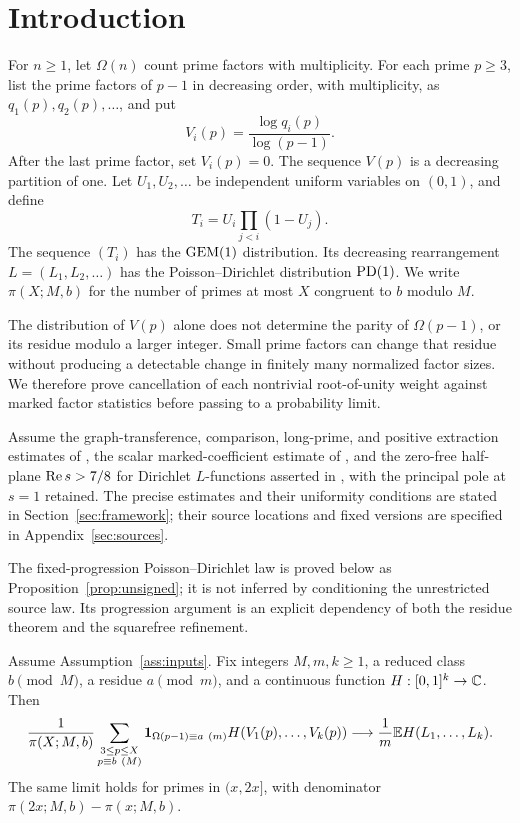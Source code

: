 \section{Introduction}\label{sec:statements}

For $n\geq1$, let $\Omega(n)$ count prime factors with multiplicity.
For each prime $p\geq3$, list the prime factors of $p-1$ in decreasing
order, with multiplicity, as $q_1(p),q_2(p),\ldots$, and put
\[
 V_i(p)=\frac{\log q_i(p)}{\log(p-1)}.
\]
After the last prime factor, set $V_i(p)=0$. The sequence $V(p)$ is a
decreasing partition of one. Let $U_1,U_2,\ldots$ be independent uniform
variables on $(0,1)$, and define
\[
 T_i=U_i\prod_{j<i}(1-U_j).
\]
The sequence $(T_i)$ has the $\operatorname{GEM}(1)$ distribution. Its decreasing
rearrangement $L=(L_1,L_2,\ldots)$ has the Poisson--Dirichlet distribution
$\operatorname{PD}(1)$. We write $\pi(X;M,b)$ for the number of primes at most $X$
congruent to $b$ modulo $M$.

The distribution of $V(p)$ alone does not determine the parity of
$\Omega(p-1)$, or its residue modulo a larger integer. Small prime factors
can change that residue without producing a detectable change in finitely
many normalized factor sizes. We therefore prove cancellation of each
nontrivial root-of-unity weight against marked factor statistics before
passing to a probability limit.

\begin{assumption}\label{ass:inputs}
Assume the graph-transference, comparison, long-prime, and positive
extraction estimates of \cite{D,S}, the scalar marked-coefficient
estimate of \cite{P}, and the zero-free half-plane $\operatorname{Re} s>7/8$ for
Dirichlet $L$-functions asserted in \cite{Z}, with the principal pole
at $s=1$ retained. The precise estimates and their uniformity conditions
are stated in Section~\ref{sec:framework}; their source locations and
fixed versions are specified in Appendix~\ref{sec:sources}.
\end{assumption}

The fixed-progression Poisson--Dirichlet law is proved below as
Proposition~\ref{prop:unsigned}; it is not inferred by conditioning the
unrestricted source law. Its progression argument is an explicit
dependency of both the residue theorem and the squarefree refinement.

\begin{theorem}\label{thm:main}
Assume Assumption~\ref{ass:inputs}. Fix integers $M,m,k\geq1$, a reduced
class $b\pmod M$, a residue $a\pmod m$, and a continuous function
$H:[0,1]^k\to\mathbb C$. Then
\begin{equation}\label{eq:main}
 \frac{1}{\pi(X;M,b)}
 \sum_{\substack{3\leq p\leq X\\p\equiv b\ (M)}}
 \mathbf 1_{\Omega(p-1)\equiv a\ (m)}H(V_1(p),\ldots,V_k(p))
 \longrightarrow \frac1m\mathbb E H(L_1,\ldots,L_k).
\end{equation}
The same limit holds for primes in $(x,2x]$, with denominator
$\pi(2x;M,b)-\pi(x;M,b)$.
\end{theorem}

